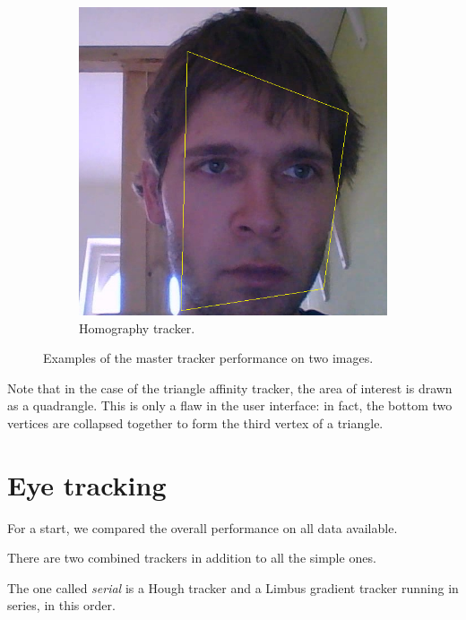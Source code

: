 \begin{figure}[t]
\begin{subfigure}[b]{0.49\textwidth}
	\end{subfigure}
	\begin{subfigure}[b]{0.49\textwidth}
		\centering \includegraphics[width=\linewidth]{img/res-face-persp.png} \caption{Homography tracker.} \label{i:res-face-persp}
	\end{subfigure}
	\caption{Examples of the master tracker performance on two images.}\label{i:res-face}
\end{figure}

Note that in the case of the triangle affinity tracker, the area of interest is drawn as a quadrangle.
This is only a flaw in the user interface: in fact, the bottom two vertices are collapsed together to form the third vertex of a triangle.

\section{Eye tracking}

For a start, we compared the overall performance on all data available.

There are two combined trackers in addition to all the simple ones.

The one called \textit{serial} is a Hough tracker and a Limbus gradient tracker running in series, in this order.

